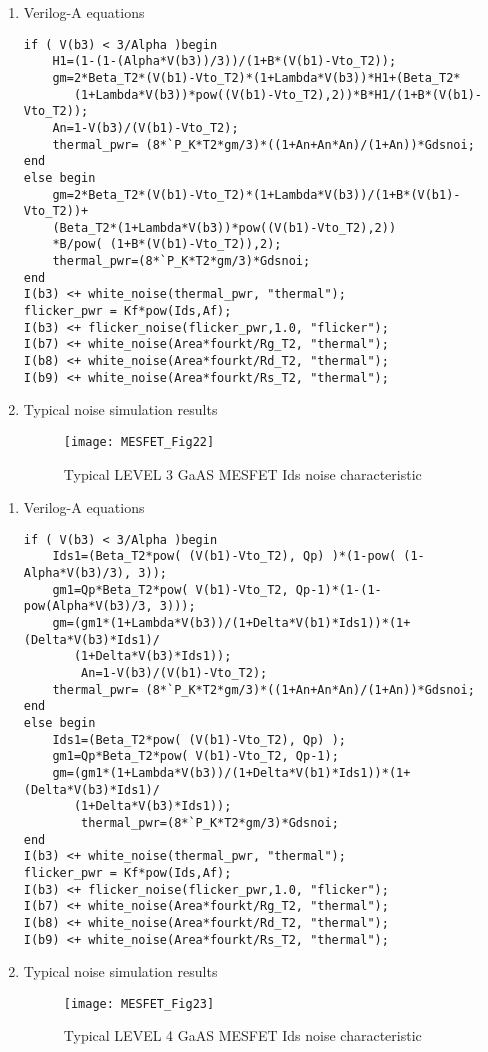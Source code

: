 \begin{enumerate}
 \item Verilog-A equations
\begin{verbatim}
if ( V(b3) < 3/Alpha )begin
	H1=(1-(1-(Alpha*V(b3))/3))/(1+B*(V(b1)-Vto_T2));
	gm=2*Beta_T2*(V(b1)-Vto_T2)*(1+Lambda*V(b3))*H1+(Beta_T2*
	   (1+Lambda*V(b3))*pow((V(b1)-Vto_T2),2))*B*H1/(1+B*(V(b1)-Vto_T2));
	An=1-V(b3)/(V(b1)-Vto_T2); 
	thermal_pwr= (8*`P_K*T2*gm/3)*((1+An+An*An)/(1+An))*Gdsnoi;
end
else begin
	gm=2*Beta_T2*(V(b1)-Vto_T2)*(1+Lambda*V(b3))/(1+B*(V(b1)-Vto_T2))+
	(Beta_T2*(1+Lambda*V(b3))*pow((V(b1)-Vto_T2),2))
	*B/pow( (1+B*(V(b1)-Vto_T2)),2);
	thermal_pwr=(8*`P_K*T2*gm/3)*Gdsnoi;
end
I(b3) <+ white_noise(thermal_pwr, "thermal"); 
flicker_pwr = Kf*pow(Ids,Af);
I(b3) <+ flicker_noise(flicker_pwr,1.0, "flicker");
I(b7) <+ white_noise(Area*fourkt/Rg_T2, "thermal");
I(b8) <+ white_noise(Area*fourkt/Rd_T2, "thermal");
I(b9) <+ white_noise(Area*fourkt/Rs_T2, "thermal"); 
\end{verbatim} 

\item Typical noise simulation results
\begin{figure} [h]
  \centering
  \texttt{[image: MESFET\_Fig22]}  
  \caption{Typical LEVEL 3 GaAS MESFET Ids noise characteristic} 
  \label{fig:fig22} 
\end{figure} 

\end{enumerate}

\begin{enumerate}
 \item Verilog-A equations
\begin{verbatim}
if ( V(b3) < 3/Alpha )begin
	Ids1=(Beta_T2*pow( (V(b1)-Vto_T2), Qp) )*(1-pow( (1-Alpha*V(b3)/3), 3));
	gm1=Qp*Beta_T2*pow( V(b1)-Vto_T2, Qp-1)*(1-(1-pow(Alpha*V(b3)/3, 3)));
	gm=(gm1*(1+Lambda*V(b3))/(1+Delta*V(b1)*Ids1))*(1+(Delta*V(b3)*Ids1)/
	   (1+Delta*V(b3)*Ids1)); 
        An=1-V(b3)/(V(b1)-Vto_T2); 
	thermal_pwr= (8*`P_K*T2*gm/3)*((1+An+An*An)/(1+An))*Gdsnoi;
end
else begin
	Ids1=(Beta_T2*pow( (V(b1)-Vto_T2), Qp) ); 
	gm1=Qp*Beta_T2*pow( V(b1)-Vto_T2, Qp-1);
	gm=(gm1*(1+Lambda*V(b3))/(1+Delta*V(b1)*Ids1))*(1+(Delta*V(b3)*Ids1)/
	   (1+Delta*V(b3)*Ids1)); 
        thermal_pwr=(8*`P_K*T2*gm/3)*Gdsnoi;
end
I(b3) <+ white_noise(thermal_pwr, "thermal"); 
flicker_pwr = Kf*pow(Ids,Af);
I(b3) <+ flicker_noise(flicker_pwr,1.0, "flicker");
I(b7) <+ white_noise(Area*fourkt/Rg_T2, "thermal");
I(b8) <+ white_noise(Area*fourkt/Rd_T2, "thermal");
I(b9) <+ white_noise(Area*fourkt/Rs_T2, "thermal"); 
\end{verbatim} 

\item Typical noise simulation results
\begin{figure} [h]
  \centering
  \texttt{[image: MESFET\_Fig23]}  
  \caption{Typical LEVEL 4 GaAS MESFET Ids noise characteristic} 
  \label{fig:fig23} 
\end{figure} 

\end{enumerate}

